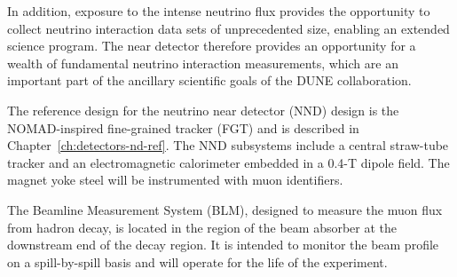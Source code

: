 In addition, exposure
to the intense neutrino flux provides the opportunity to collect
neutrino interaction data sets of unprecedented size, enabling an extended
science program.  The near detector therefore provides an
opportunity for a wealth of fundamental neutrino interaction
measurements, which are an important part of the ancillary %
scientific
goals of the DUNE collaboration.  

The reference design for the
neutrino near detector (NND) design is the NOMAD-inspired fine-grained
tracker (FGT) and is described in
Chapter~\ref{ch:detectors-nd-ref}. The NND subsystems include a
central straw-tube tracker and an electromagnetic calorimeter embedded
in a 0.4-T dipole field. The magnet yoke steel will be instrumented
with muon identifiers.

The Beamline
Measurement System (BLM), designed to measure the muon
flux from hadron decay, is located in the region of the beam absorber at
the downstream end of the decay region. It is intended to monitor the beam
profile on a spill-by-spill basis and will operate for the life of
the experiment.
